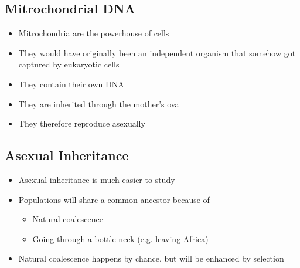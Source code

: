
\begin{slide}
\section{Mitrochondrial DNA}

\begin{PauseHighLight}
  \begin{itemize}
  \item Mitrochondria are the powerhouse of cells\pause
  \item They would have originally been an independent organism that
    somehow got captured by eukaryotic cells\pause
  \item They contain their own DNA\pause
  \item They are inherited through the mother's ova\pause
  \item They therefore reproduce asexually\pause
  \end{itemize}
\end{PauseHighLight}

\end{slide}


\begin{slide}
\section{Asexual Inheritance}

\begin{PauseHighLight}
  \begin{itemize}
  \item Asexual inheritance is much easier to study\pause
  \item Populations will share a common ancestor because of
    \begin{itemize}
    \item Natural coalescence\pause
    \item Going through a bottle neck (e.g. leaving Africa)\pause
    \end{itemize}
  \item Natural coalescence happens by chance, but will be enhanced by
    selection\pause
  \end{itemize}
\end{PauseHighLight}

\end{slide}

